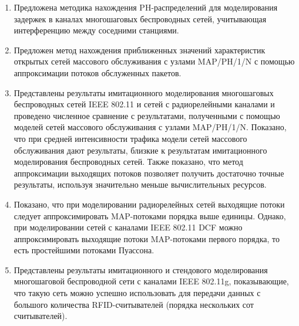 \begin{enumerate}
  \item Предложена методика нахождения PH-распределений для моделирования задержек в каналах многошаговых беспроводных сетей, учитывающая интерференцию между соседними станциями.
  \item Предложен метод нахождения приближенных значений характеристик открытых сетей массового обслуживания с узлами MAP/PH/1/N с помощью аппроксимации потоков обслуженных пакетов.
  \item Представлены результаты имитационного моделирования многошаговых беспроводных сетей IEEE 802.11 и сетей с радиорелейными каналами и проведено численное сравнение с результатами, полученными с помощью моделей сетей массового обслуживания с узлами MAP/PH/1/N. Показано, что при средней интенсивности трафика модели сетей массового обслуживания дают результаты, близкие к результатам имитационного моделирования беспроводных сетей. Также показано, что метод аппроксимации выходящих потоков позволяет получить достаточно точные результаты, используя значительно меньше вычислительных ресурсов.
  \item Показано, что при моделировании радиорелейных сетей выходящие потоки следует аппроксимировать MAP-потоками порядка выше единицы. Однако, при моделировании сетей с каналами IEEE 802.11 DCF можно аппроксимировать выходящие потоки MAP-потоками первого порядка, то есть простейшими потоками Пуассона.
  \item Представлены результаты имитационного и стендового моделирования многошаговой беспроводной сети с каналами IEEE 802.11g, показывающие, что такую сеть можно успешно использовать для передачи данных с большого количества RFID-считывателей (порядка нескольких сот считывателей).
\end{enumerate}


\clearpage

